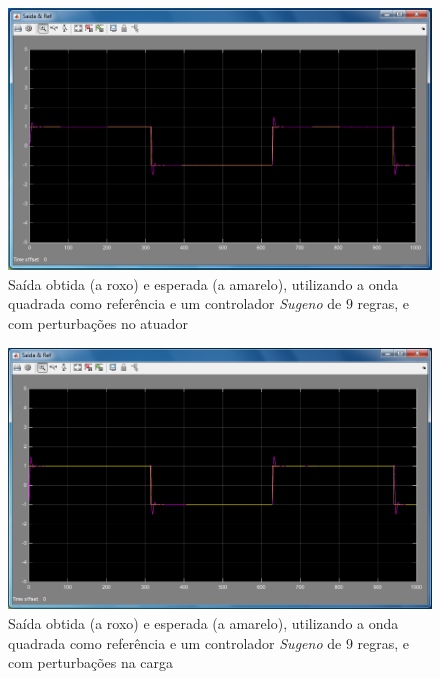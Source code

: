 \documentclass{article}
\begin{document}
\begin{figure}[h]
  \centering
      \includegraphics[scale=0.3]{Images/Sugeno_9_square_actuator.png}
  \caption{Saída obtida (a roxo) e esperada (a amarelo), utilizando a onda quadrada como referência e um controlador \emph{Sugeno} de $9$ regras, e com perturbações no atuador}
\end{figure}

\begin{figure}[h]
  \centering
      \includegraphics[scale=0.3]{Images/Sugeno_9_square_charge.png}
  \caption{Saída obtida (a roxo) e esperada (a amarelo), utilizando a onda quadrada como referência e um controlador \emph{Sugeno} de $9$ regras, e com perturbações na carga}
\end{figure}
\end{document}
